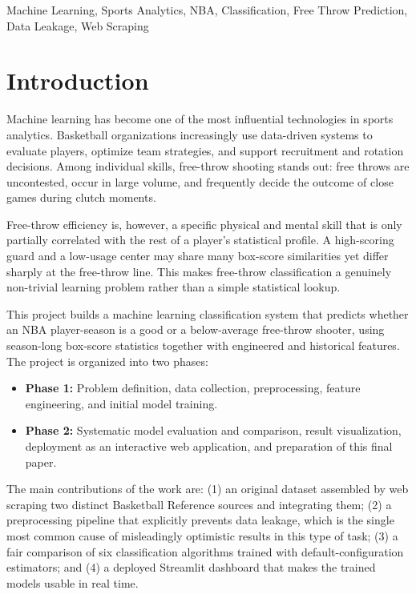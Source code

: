 \documentclass[conference]{IEEEtran}
\begin{document}
\begin{IEEEkeywords}
Machine Learning, Sports Analytics, NBA, Classification, Free Throw Prediction, Data Leakage, Web Scraping
\end{IEEEkeywords}


\section{Introduction}

Machine learning has become one of the most influential technologies in sports analytics. Basketball organizations increasingly use data-driven systems to evaluate players, optimize team strategies, and support recruitment and rotation decisions. Among individual skills, free-throw shooting stands out: free throws are uncontested, occur in large volume, and frequently decide the outcome of close games during clutch moments.

Free-throw efficiency is, however, a specific physical and mental skill that is only partially correlated with the rest of a player's statistical profile. A high-scoring guard and a low-usage center may share many box-score similarities yet differ sharply at the free-throw line. This makes free-throw classification a genuinely non-trivial learning problem rather than a simple statistical lookup.

This project builds a machine learning classification system that predicts whether an NBA player-season is a good or a below-average free-throw shooter, using season-long box-score statistics together with engineered and historical features. The project is organized into two phases:

\begin{itemize}
\item \textbf{Phase 1:} Problem definition, data collection, preprocessing, feature engineering, and initial model training.
\item \textbf{Phase 2:} Systematic model evaluation and comparison, result visualization, deployment as an interactive web application, and preparation of this final paper.
\end{itemize}

The main contributions of the work are: (1) an original dataset assembled by web scraping two distinct Basketball Reference sources and integrating them; (2) a preprocessing pipeline that explicitly prevents data leakage, which is the single most common cause of misleadingly optimistic results in this type of task; (3) a fair comparison of six classification algorithms trained with default-configuration estimators; and (4) a deployed Streamlit dashboard that makes the trained models usable in real time.
\end{document}
